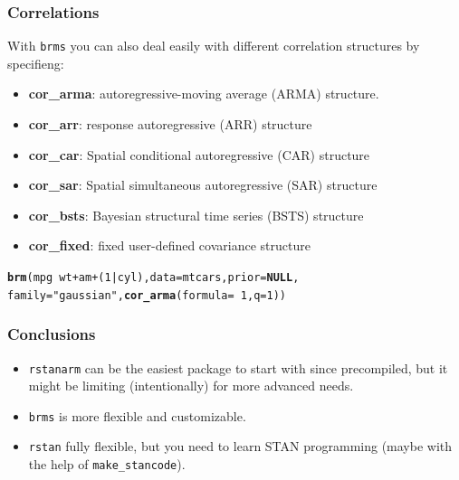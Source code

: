 \documentclass[handout]{beamer}\usepackage[]{graphicx}\usepackage[]{color}
\makeatletter
\newcommand{\hlnum}[1]{\textcolor[rgb]{0.686,0.059,0.569}{#1}}%
\newcommand{\hlstr}[1]{\textcolor[rgb]{0.192,0.494,0.8}{#1}}%
\newcommand{\hlopt}[1]{\textcolor[rgb]{0,0,0}{#1}}%
\newcommand{\hlstd}[1]{\textcolor[rgb]{0.345,0.345,0.345}{#1}}%
\newcommand{\hlkwa}[1]{\textcolor[rgb]{0.161,0.373,0.58}{\textbf{#1}}}%
\newcommand{\hlkwc}[1]{\textcolor[rgb]{0.333,0.667,0.333}{#1}}%
\newcommand{\hlkwd}[1]{\textcolor[rgb]{0.737,0.353,0.396}{\textbf{#1}}}%
\newenvironment{kframe}{%
 \def\at@end@of@kframe{}%
 \ifinner\ifhmode%
  \def\at@end@of@kframe{\end{minipage}}%
  \begin{minipage}{\columnwidth}%
 \fi\fi%
 \def\FrameCommand##1{\hskip\@totalleftmargin \hskip-\fboxsep
 \colorbox{shadecolor}{##1}\hskip-\fboxsep
     \hskip-\linewidth \hskip-\@totalleftmargin \hskip\columnwidth}%
 \MakeFramed {\advance\hsize-\width
   \@totalleftmargin\z@ \linewidth\hsize
   \@setminipage}}%
 {\par\unskip\endMakeFramed%
 \at@end@of@kframe}
\newenvironment{knitrout}{}{} %
\makeatother
\begin{document}

\begin{frame}[fragile]
\frametitle{Correlations}
With \texttt{brms} you can also deal easily with different correlation structures by specifieng: \\
\begin{itemize}
\item \textbf{cor_arma}: autoregressive-moving average (ARMA) structure. \\
\item \textbf{cor_arr}: response autoregressive (ARR) structure \\
\item \textbf{cor_car}: Spatial conditional autoregressive (CAR) structure \\
\item \textbf{cor_sar}: Spatial simultaneous autoregressive (SAR) structure \\
\item \textbf{cor_bsts}: Bayesian structural time series (BSTS) structure \\
\item \textbf{cor_fixed}: fixed user-defined covariance structure \\
\end{itemize}

\begin{knitrout}
\color{fgcolor}\begin{kframe}
\begin{alltt}
\hlkwd{brm}\hlstd{(mpg} \hlopt{~} \hlstd{wt} \hlopt{+} \hlstd{am} \hlopt{+} \hlstd{(}\hlnum{1}\hlopt{|}\hlstd{cyl),} \hlkwc{data} \hlstd{= mtcars,} \hlkwc{prior} \hlstd{=} \hlkwa{NULL}\hlstd{,}
    \hlkwc{family}\hlstd{=}\hlstr{"gaussian"}\hlstd{,} \hlkwd{cor_arma}\hlstd{(}\hlkwc{formula} \hlstd{=} \hlopt{~}\hlnum{1}\hlstd{,} \hlkwc{q} \hlstd{=} \hlnum{1}\hlstd{))}
\end{alltt}
\end{kframe}
\end{knitrout}

\end{frame}


\begin{frame}
\frametitle{Conclusions}
\pause
\begin{itemize}
\item \texttt{rstanarm} can be the easiest package to start with since precompiled, but it might be limiting (intentionally) for more advanced needs.
\pause
\item \texttt{brms} is more flexible and customizable.
\pause
\item \texttt{rstan} fully flexible, but you need to learn STAN programming (maybe with the help of \texttt{make_stancode}).
\end{itemize}
\end{frame}
\end{document}

